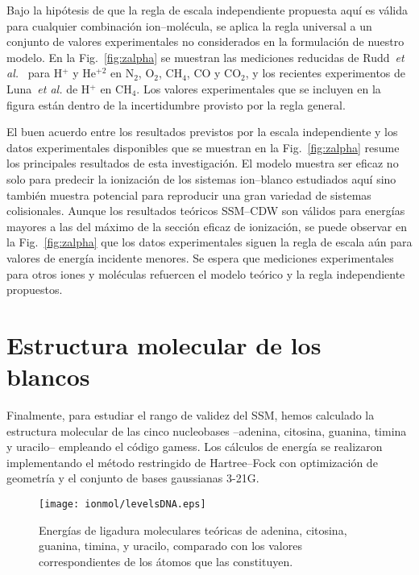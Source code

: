 Bajo la hipótesis de que la regla de escala independiente propuesta aquí 
es válida para cualquier combinación ion--molécula, se aplica la regla 
universal a un conjunto de valores experimentales no considerados en la
formulación de nuestro modelo. En la Fig.~\ref{fig:zalpha} se muestran 
las mediciones reducidas de Rudd~\textit{et al.}~\cite{Rudd:85,Rudd:83} 
para H$^{+}$ y He$^{+2}$ en N$_2$, O$_2$, CH$_4$, CO y CO$_2$, y los 
recientes experimentos de Luna~\textit{et al.} \cite{Luna2019} de 
H$^{+}$ en CH$_4$. Los valores experimentales que se incluyen en la 
figura están dentro de la incertidumbre provisto por la regla general.

El buen acuerdo entre los resultados previstos por la escala 
independiente y los datos experimentales disponibles que se muestran en 
la Fig.~\ref{fig:zalpha} resume los principales resultados de esta 
investigación. El modelo muestra ser eficaz no solo para predecir la 
ionización de los sistemas ion--blanco estudiados aquí sino también 
muestra potencial para reproducir una gran variedad de sistemas 
colisionales. Aunque los resultados teóricos SSM--CDW son válidos para 
energías mayores a las del máximo de la sección eficaz de ionización, 
se puede observar en la Fig.~\ref{fig:zalpha} que los datos 
experimentales siguen la regla de escala aún para valores de energía 
incidente menores. Se espera que mediciones experimentales para otros 
iones y moléculas refuercen el modelo teórico y la regla independiente 
propuestos.

\section{Estructura molecular de los blancos}
\label{sec:molcalculations}

Finalmente, para estudiar el rango de validez del SSM, hemos calculado 
la estructura molecular de las cinco nucleobases --adenina, citosina, 
guanina, timina y uracilo-- empleando el código {\sc gamess}. Los 
cálculos de energía se realizaron implementando el método restringido de 
Hartree--Fock con optimización de geometría y el conjunto de bases 
gaussianas 3-21G. 

\begin{figure}[t]
\centering
\texttt{[image: ionmol/levelsDNA.eps]}
\caption[Energías de ligadura moleculares teóricas de ADN y ARN.]
{Energías de ligadura moleculares teóricas de adenina, citosina, 
guanina, timina, y uracilo, comparado con los valores correspondientes 
de los átomos que las constituyen.}
\label{fig:ADNbindener}
\end{figure}


